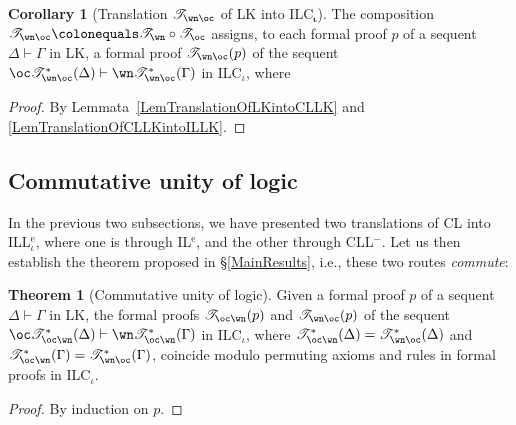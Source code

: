 \documentclass[a4paper]{article}
\theoremstyle{definition}
\theoremstyle{theorem}
\newtheorem{theorem}[definition]{Theorem}
\newtheorem{corollary}[definition]{Corollary}
\theoremstyle{remark}
\begin{document}
\begin{corollary}[Translation $\mathscr{T}_{\wn\oc}$ of \textsf{LK} into \textsf{ILC}$_{\boldsymbol{\iota}}$]
\label{CoroAnotherTranslationOfLKintoILLK_mu}
The composition $\mathscr{T}_{\wn\oc} \colonequals \mathscr{T}_\wn \circ \mathscr{T}_\oc$ assigns, to each formal proof $p$ of a sequent $\Delta \vdash \Gamma$ in \textsf{LK}, a formal proof $\mathscr{T}_{\wn\oc}(p)$ of the sequent $\oc \mathscr{T}_{\wn\oc}^\ast(\Delta) \vdash \wn \mathscr{T}_{\wn\oc}^\ast(\Gamma)$ in \textsf{ILC$_\iota$}, where
\end{corollary}
\begin{proof}
By Lemmata~\ref{LemTranslationOfLKintoCLLK} and \ref{LemTranslationOfCLLKintoILLK}.
\end{proof}














\subsection{Commutative unity of logic}
\label{SubsectionCommutativeUnityOfLogic}
In the previous two subsections, we have presented two translations of CL into ILL$^{\text{e}}_\iota$, where one is through IL$^{\text{e}}$, and the other through CLL$^-$.
Let us then establish the theorem proposed in \S\ref{MainResults}, i.e., these two routes \emph{commute}:
\begin{theorem}[Commutative unity of logic]
\label{ThmCommutativeUnityOfLogic}
Given a formal proof $p$ of a sequent $\Delta \vdash \Gamma$ in \textsf{LK}, the formal proofs $\mathscr{T}_{\oc\wn}(p)$ and $\mathscr{T}_{\wn\oc}(p)$ of the sequent $\oc \mathscr{T}_{\oc\wn}^\ast(\Delta) \vdash \wn \mathscr{T}_{\oc\wn}^\ast(\Gamma)$ in \textsf{ILC$_\iota$}, where $\mathscr{T}_{\oc\wn}^\ast(\Delta) = \mathscr{T}_{\wn\oc}^\ast(\Delta)$ and $\mathscr{T}_{\oc\wn}^\ast(\Gamma) = \mathscr{T}_{\wn\oc}^\ast(\Gamma)$, coincide modulo permuting axioms and rules in formal proofs in \textsf{ILC$_\iota$}.
\end{theorem}
\begin{proof}
By induction on $p$.
\end{proof}
\end{document}
